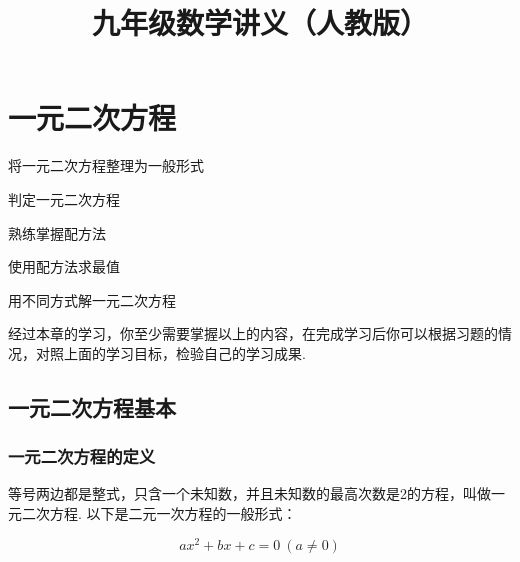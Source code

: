 \documentclass[lang=cn, 10pt, titlestyle=hang]{elegantbook}
\title{九年级数学讲义（人教版）}
\begin{document}
\tableofcontents

\chapter{一元二次方程}



\begin{introduction}[本章学习目标]

\item 将一元二次方程整理为一般形式
\item 判定一元二次方程
\item 熟练掌握配方法
\item 使用配方法求最值
\item 用不同方式解一元二次方程

\end{introduction}

经过本章的学习，你至少需要掌握以上的内容，在完成学习后你可以根据习题的情况，对照上面的学习目标，检验自己的学习成果.

\section{一元二次方程基本}
\subsection{一元二次方程的定义}


\begin{definition}
  
等号两边都是整式，只含一个未知数，并且未知数的最高次数是2的方程，叫做一元二次方程. 以下是二元一次方程的一般形式：

\begin{equation}
    ax^2 + bx + c = 0 \ (a \neq 0)
    \label{general_formula}
\end{equation}

 
\end{definition}
\end{document}

